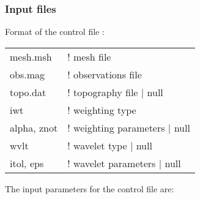 \subsubsection{Input files}
Format of the control file :
%
\begin{fileExample}
\begin{tabular}{|ll|}
\hline
mesh.msh & ! mesh file \\
obs.mag & ! observations file \\
topo.dat & ! topography file | null \\
iwt & ! weighting type\\
alpha, znot & ! weighting parameters | null \\
wvlt & ! wavelet type | null\\
itol, eps & ! wavelet parameters | null \\
\hline
\end{tabular}
\end{fileExample}
%
The input parameters for the control file are:
